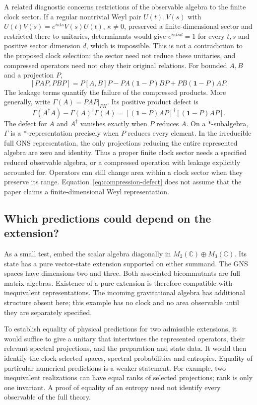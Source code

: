 \documentclass[11pt]{article}
\newcommand{\id}{\mathbf{1}}
\begin{document}
A related diagnostic concerns restrictions of the observable algebra to the finite clock sector. If a regular nontrivial Weyl pair $U(t),V(s)$ with $U(t)V(s)=e^{i\kappa ts}V(s)U(t)$, $\kappa\ne0$, preserved a finite-dimensional sector and restricted there to unitaries, determinants would give $e^{i\kappa tsd}=1$ for every $t,s$ and positive sector dimension $d$, which is impossible. This is not a contradiction to the proposed clock selection: the sector need not reduce these unitaries, and compressed operators need not obey their original relations. For bounded $A,B$ and a projection $P$,
\[
 [PAP,PBP]=P[A,B]P-PA(\id-P)BP+PB(\id-P)AP.
\]
The leakage terms quantify the failure of the compressed products. More generally, write $\Gamma(A)=PAP|_{PH}$. Its positive product defect is
\begin{equation}\label{eq:compression-defect}
 \Gamma(A^\dagger A)-\Gamma(A)^\dagger\Gamma(A)
 =[(\id-P)AP]^\dagger[(\id-P)AP].
\end{equation}
The defect for $A$ and $A^\dagger$ vanishes exactly when $P$ reduces $A$. On a $*$-subalgebra, $\Gamma$ is a $*$-representation precisely when $P$ reduces every element. In the irreducible full GNS representation, the only projections reducing the entire represented algebra are zero and identity. Thus a proper finite clock sector needs a specified reduced observable algebra, or a compressed operation with leakage explicitly accounted for. Operators can still change area within a clock sector when they preserve its range. Equation~\eqref{eq:compression-defect} does not assume that the paper claims a finite-dimensional Weyl representation.

\subsection{Which predictions could depend on the extension?}
As a small test, embed the scalar algebra diagonally in $M_2(\mathbb C)\oplus M_3(\mathbb C)$. Its state has a pure vector-state extension supported on either summand. The GNS spaces have dimensions two and three. Both associated bicommutants are full matrix algebras. Existence of a pure extension is therefore compatible with inequivalent representations. The incoming gravitational algebra has additional structure absent here; this example has no clock and no area observable until they are separately specified.

To establish equality of physical predictions for two admissible extensions, it would suffice to give a unitary that intertwines the represented operators, their relevant spectral projections, and the preparation and state data. It would then identify the clock-selected spaces, spectral probabilities and entropies. Equality of particular numerical predictions is a weaker statement. For example, two inequivalent realizations can have equal ranks of selected projections; rank is only one invariant. A proof of equality of an entropy need not identify every observable of the full theory. 
\end{document}
